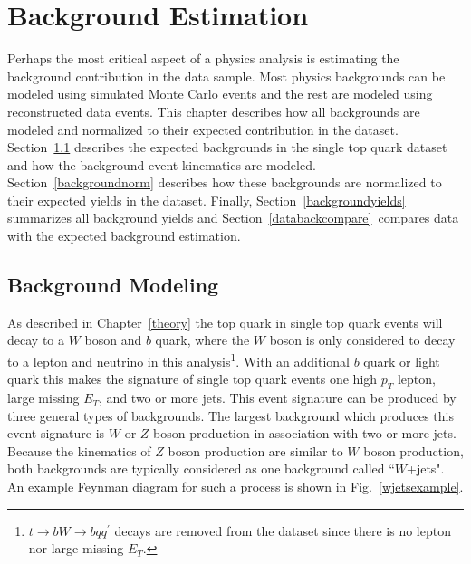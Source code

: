 \chapter{Background Estimation}
\label{background}
\label{backgrounds}

Perhaps the most critical aspect of a physics analysis is estimating the background contribution in the data sample. Most physics backgrounds can be modeled using simulated Monte Carlo events and the rest are modeled using reconstructed data events. This chapter describes how all backgrounds are modeled and normalized to their expected contribution in the dataset. Section~\ref{backgroundmodel} describes the expected backgrounds in the single top quark dataset and how the background event kinematics are modeled. Section~\ref{backgroundnorm} describes how these backgrounds are normalized to their expected yields in the dataset. Finally, Section~\ref{backgroundyields} summarizes all background yields and Section~\ref{databackcompare}~compares data with the expected background estimation.

\section{Background Modeling}
\label{backgroundmodel}

As described in Chapter~\ref{theory} the top quark in single top quark events will decay to a $W$ boson and $b$ quark, where the $W$ boson is only considered to decay to a lepton and neutrino in this analysis\footnote{$t\rightarrow bW \rightarrow bqq^{'}$ decays are removed from the dataset since there is no lepton nor large missing $E_{T}$.}. With an additional $b$ quark or light quark this makes the signature of single top quark events one high $p_{T}$ lepton, large missing $E_{T}$, and two or more jets. This event signature can be produced by three general types of backgrounds. The largest background which produces this event signature is $W$ or $Z$ boson production in association with two or more jets. Because the kinematics of $Z$ boson production are similar to $W$ boson production, both backgrounds are typically considered as one background called ``$W$+jets". An example Feynman diagram for such a process is shown in Fig.~\ref{wjetsexample}.

